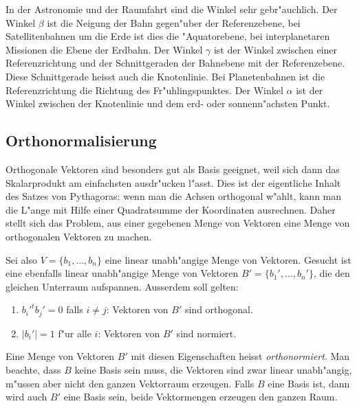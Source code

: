 In der Astronomie und der Raumfahrt sind die Winkel sehr gebr"auchlich.
Der Winkel $\beta$ ist die Neigung der Bahn gegen"uber der Referenzebene,
bei Satellitenbahnen um die Erde ist dies die "Aquatorebene,
bei interplanetaren Missionen die Ebene der Erdbahn.
Der Winkel $\gamma$ ist der Winkel zwischen einer Referenzrichtung
und der Schnittgeraden der Bahnebene mit der Referenzebene.
Diese Schnittgerade heisst auch die Knotenlinie.
Bei Planetenbahnen ist die Referenzrichtung die Richtung des Fr"uhlingspunktes.
Der Winkel $\alpha$ ist der Winkel zwischen der Knotenlinie und dem
erd- oder sonnenn"achsten Punkt.



\subsection{Orthonormalisierung}
Orthogonale Vektoren sind besonders gut als Basis geeignet, weil
sich dann das Skalarprodukt am einfachsten ausdr"ucken l"asst.
Dies ist der eigentliche Inhalt des Satzes von Pythagoras: wenn
man die Achsen orthogonal w"ahlt, kann man die L"ange mit Hilfe
einer Quadratsumme der Koordinaten ausrechnen.
Daher stellt sich 
das Problem, aus einer gegebenen Menge von Vektoren eine Menge
von orthogonalen Vektoren zu machen.

Sei also $V=\{b_1,\dots,b_n\}$ eine linear unabh"angige Menge von
Vektoren.
Gesucht ist eine ebenfalls linear unabh"angige Menge 
von Vektoren $B'=\{b_1',\dots,b_n'\}$, die den gleichen Unterraum
aufspannen.
Ausserdem soll gelten:
\begin{enumerate}
\item $b_i'^tb_j'=0$ falls $i\ne j$: Vektoren von $B'$ sind orthogonal.
\item $|b_i'|=1$ f"ur alle $i$: Vektoren von $B'$ sind normiert.
\end{enumerate}
Eine Menge von Vektoren $B'$ mit diesen Eigenschaften heisst
{\it orthonormiert}.
Man beachte, dass $B$ keine Basis sein muss, die Vektoren sind zwar
linear unabh"angig, m"ussen aber nicht den ganzen Vektorraum erzeugen.
Falls $B$ eine Basis ist, dann wird auch $B'$ eine Basis sein, beide
Vektormengen erzeugen den ganzen Raum.

